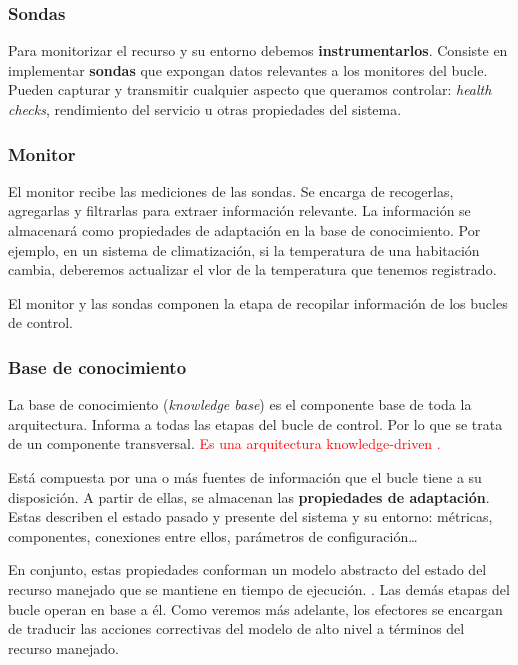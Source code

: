 \subsubsection{Sondas}

Para monitorizar el recurso y su entorno debemos \textbf{instrumentarlos}. Consiste en implementar \textbf{sondas} que expongan datos relevantes a los monitores del bucle. Pueden capturar y transmitir cualquier aspecto que queramos controlar: \emph{health checks}, rendimiento del servicio u otras propiedades del sistema.

\subsubsection{Monitor}

El monitor recibe las mediciones de las sondas. Se encarga de recogerlas, agregarlas y filtrarlas para extraer información relevante. La información se almacenará como propiedades de adaptación en la base de conocimiento.\cite{fonsEspecificacionSistemasAutoadaptativos2021} Por ejemplo, en un sistema de climatización, si la temperatura de una habitación cambia, deberemos actualizar el vlor de la temperatura que tenemos registrado.

El monitor y las sondas componen la etapa de recopilar información de los bucles de control.

\subsubsection{Base de conocimiento}

La base de conocimiento (\emph{knowledge base}) es el componente base de toda la arquitectura. Informa a todas las etapas del bucle de control. Por lo que se trata de un componente transversal. \textcolor{red}{Es una arquitectura knowledge-driven \cite{taylorSoftwareArchitectureFoundations2009}.}

Está compuesta por una o más fuentes de información que el bucle tiene a su disposición. A partir de ellas, se almacenan las \textbf{propiedades de adaptación}. Estas describen el estado pasado y presente del sistema y su entorno: métricas, componentes, conexiones entre ellos, parámetros de configuración\dots

En conjunto, estas propiedades conforman un modelo abstracto del estado del recurso manejado que se mantiene en tiempo de ejecución. \cite{garlanIncreasingSystemDependability2003}. Las demás etapas del bucle operan en base a él. Como veremos más adelante, los efectores se encargan de traducir las acciones correctivas del modelo de alto nivel a términos del recurso manejado.


